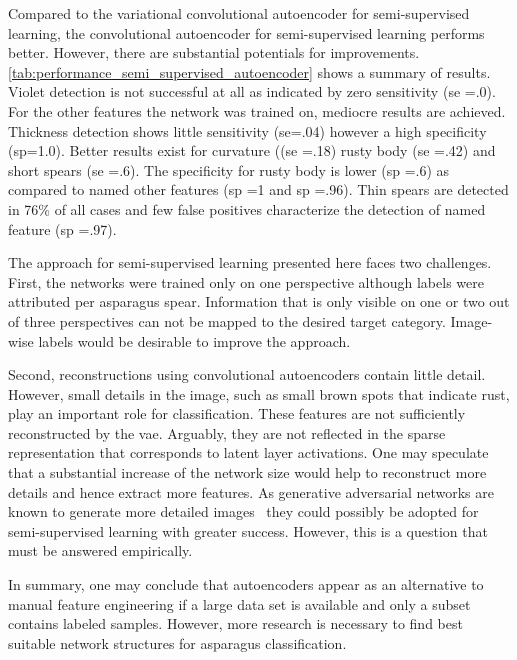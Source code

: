 Compared to the variational convolutional autoencoder for semi-supervised learning, the convolutional autoencoder for semi-supervised learning performs better. However, there are substantial potentials for improvements. \autoref{tab:performance_semi_supervised_autoencoder} shows a summary of results. Violet detection is not successful at all as indicated by zero sensitivity (\acrshort{se} =.0). For the other features the network was trained on, mediocre results are achieved. Thickness detection shows little sensitivity (se=.04) however a high specificity (sp=1.0). Better results exist for curvature ((\acrshort{se} =.18) rusty body (\acrshort{se} =.42) and short spears (\acrshort{se} =.6). The specificity for rusty body is lower (\acrshort{sp} =.6) as compared to named other features (\acrshort{sp} =1 and \acrshort{sp} =.96). Thin spears are detected in 76\% of all cases and few false positives characterize the detection of named feature (\acrshort{sp} =.97).

The approach for semi-supervised learning presented here faces two challenges. First, the networks were trained only on one perspective although labels were attributed per asparagus spear. Information that is only visible on one or two out of three perspectives can not be mapped to the desired target category. Image-wise labels would be desirable to improve the approach.

Second, reconstructions using convolutional autoencoders contain little detail. However, small details in the image, such as small brown spots that indicate rust, play an important role for classification. These features are not sufficiently reconstructed by the \acrlong{vae}. Arguably, they are not reflected in the sparse representation that corresponds to latent layer activations. One may speculate that a substantial increase of the network size would help to reconstruct more details and hence extract more features. As generative adversarial networks are known to generate more detailed images~\citep{bao2017cvae} they could possibly be adopted for semi-supervised learning with greater success. However, this is a question that must be answered empirically.

\bigskip
In summary, one may conclude that autoencoders appear as an alternative to manual feature engineering if a large data set is available and only a subset contains labeled samples. However, more research is necessary to find best suitable network structures for asparagus classification.